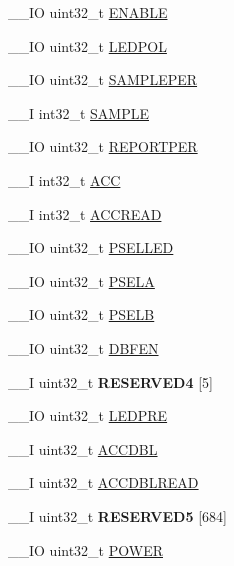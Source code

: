 \begin{DoxyCompactItemize}
\item 
\+\_\+\+\_\+\+I\+O uint32\+\_\+t \hyperlink{struct_n_r_f___q_d_e_c___type_ab25a4381da11aaf44f8e52dbd6650704}{E\+N\+A\+B\+L\+E}
\item 
\+\_\+\+\_\+\+I\+O uint32\+\_\+t \hyperlink{struct_n_r_f___q_d_e_c___type_ab272c8158314b357bff755f979df7978}{L\+E\+D\+P\+O\+L}
\item 
\+\_\+\+\_\+\+I\+O uint32\+\_\+t \hyperlink{struct_n_r_f___q_d_e_c___type_afcd50db119edc785f44bc5945f6dcf81}{S\+A\+M\+P\+L\+E\+P\+E\+R}
\item 
\+\_\+\+\_\+\+I int32\+\_\+t \hyperlink{struct_n_r_f___q_d_e_c___type_aa7396fd957a31c041c0a45abded4df39}{S\+A\+M\+P\+L\+E}
\item 
\+\_\+\+\_\+\+I\+O uint32\+\_\+t \hyperlink{struct_n_r_f___q_d_e_c___type_ab6229773a4b5b4119e2993e36575ad67}{R\+E\+P\+O\+R\+T\+P\+E\+R}
\item 
\+\_\+\+\_\+\+I int32\+\_\+t \hyperlink{struct_n_r_f___q_d_e_c___type_a78514dfafa9095d432eb94de37b438d4}{A\+C\+C}
\item 
\+\_\+\+\_\+\+I int32\+\_\+t \hyperlink{struct_n_r_f___q_d_e_c___type_ab55aa1e5dac65c12b15ae9ce608d40eb}{A\+C\+C\+R\+E\+A\+D}
\item 
\+\_\+\+\_\+\+I\+O uint32\+\_\+t \hyperlink{struct_n_r_f___q_d_e_c___type_aa5e7b93a7f4e8be10e1500996f2dcc33}{P\+S\+E\+L\+L\+E\+D}
\item 
\+\_\+\+\_\+\+I\+O uint32\+\_\+t \hyperlink{struct_n_r_f___q_d_e_c___type_a515f7792bdaf582966d3078dc48b5b81}{P\+S\+E\+L\+A}
\item 
\+\_\+\+\_\+\+I\+O uint32\+\_\+t \hyperlink{struct_n_r_f___q_d_e_c___type_a6aa23d7a92b277e601cc4bc32d3dde2d}{P\+S\+E\+L\+B}
\item 
\+\_\+\+\_\+\+I\+O uint32\+\_\+t \hyperlink{struct_n_r_f___q_d_e_c___type_a38ba26b0b350c0e1bfe7407e7206a250}{D\+B\+F\+E\+N}
\item 
\hypertarget{struct_n_r_f___q_d_e_c___type_af63ad7c0856b395d2553d28ba98cded8}{}\+\_\+\+\_\+\+I uint32\+\_\+t {\bfseries R\+E\+S\+E\+R\+V\+E\+D4} \mbox{[}5\mbox{]}\label{struct_n_r_f___q_d_e_c___type_af63ad7c0856b395d2553d28ba98cded8}

\item 
\+\_\+\+\_\+\+I\+O uint32\+\_\+t \hyperlink{struct_n_r_f___q_d_e_c___type_af6c064a24141348fd4aad3dcaa3ce936}{L\+E\+D\+P\+R\+E}
\item 
\+\_\+\+\_\+\+I uint32\+\_\+t \hyperlink{struct_n_r_f___q_d_e_c___type_ac467aea23e34220e3faf3ae839c6b401}{A\+C\+C\+D\+B\+L}
\item 
\+\_\+\+\_\+\+I uint32\+\_\+t \hyperlink{struct_n_r_f___q_d_e_c___type_a0d3b1f64fe6d77d58ffc0914ae2fa493}{A\+C\+C\+D\+B\+L\+R\+E\+A\+D}
\item 
\hypertarget{struct_n_r_f___q_d_e_c___type_a6bd7ff4e3d2ea675f206a4a408a2d0ae}{}\+\_\+\+\_\+\+I uint32\+\_\+t {\bfseries R\+E\+S\+E\+R\+V\+E\+D5} \mbox{[}684\mbox{]}\label{struct_n_r_f___q_d_e_c___type_a6bd7ff4e3d2ea675f206a4a408a2d0ae}

\item 
\+\_\+\+\_\+\+I\+O uint32\+\_\+t \hyperlink{struct_n_r_f___q_d_e_c___type_a61a3a860cc5c616b6c712b60f3390fda}{P\+O\+W\+E\+R}
\end{DoxyCompactItemize}



